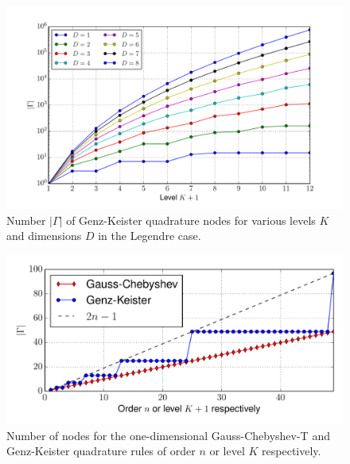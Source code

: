 \documentclass[a4paper,10pt]{article}
\begin{document}
\begin{figure}
  \centering
  \includegraphics[width=\linewidth]{./img/number_nodes_levdim_legendre.pdf}
  \caption{Number $|\Gamma|$ of Genz-Keister quadrature nodes for various
  levels $K$ and dimensions $D$ in the Legendre case.}
  \label{fig:number_nodes_levdim_legendre}
\end{figure}

\begin{figure}
  \centering
  \includegraphics[width=\linewidth]{./img/number_nodes_chebyshevt.pdf}
  \caption{Number of nodes for the one-dimensional Gauss-Chebyshev-T and Genz-Keister quadrature
  rules of order $n$ or level $K$ respectively.}
  \label{fig:number_nodes_chebyshevt}
\end{figure}
\end{document}
